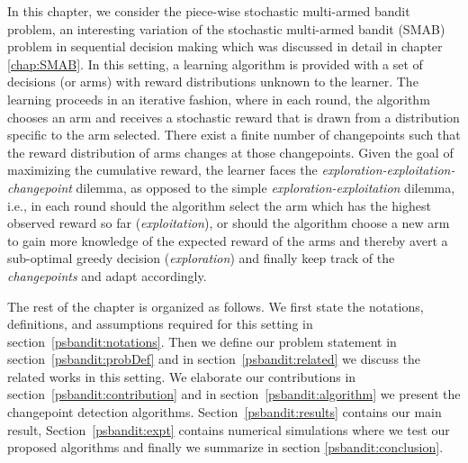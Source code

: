 In this chapter, we consider the piece-wise stochastic multi-armed bandit problem, an interesting variation of the stochastic multi-armed bandit (SMAB) problem in sequential decision making which was discussed in detail in chapter \ref{chap:SMAB}. In this setting,  a learning algorithm is provided with a set of decisions (or arms) with reward distributions unknown to the learner. The learning proceeds in an iterative fashion, where in each round, the algorithm chooses an arm and receives a stochastic reward that is drawn from a distribution specific to the arm selected. There exist a finite number of changepoints such that the reward distribution of arms changes at those changepoints. Given the goal of maximizing the cumulative reward, the learner faces the \textit{exploration-exploitation-changepoint} dilemma, as opposed to the simple \textit{exploration-exploitation} dilemma, i.e., in each round should the algorithm select the arm which has the highest observed reward so far (\textit{exploitation}), or should the algorithm choose a new arm to gain more knowledge of the expected reward of the arms and thereby avert a sub-optimal greedy decision (\textit{exploration}) and finally keep track of the \textit{changepoints} and adapt accordingly.

    The rest of the chapter is organized as follows. We first state the notations, definitions, and assumptions required for this setting in section~\ref{psbandit:notations}. Then we define our problem statement in section~\ref{psbandit:probDef} and in section~\ref{psbandit:related} we discuss the related works in this setting. We elaborate our contributions in section~\ref{psbandit:contribution} and in section~\ref{psbandit:algorithm} we present the changepoint detection algorithms. Section~\ref{psbandit:results} contains our main result, Section~\ref{psbandit:expt} contains numerical simulations where we test our proposed algorithms and finally we summarize in section \ref{psbandit:conclusion}. 

